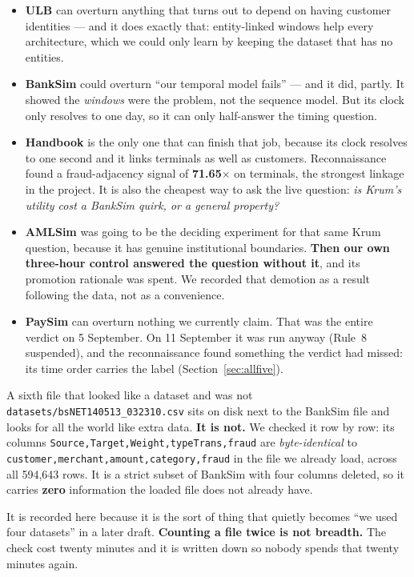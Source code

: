 \documentclass[11pt]{article}
\begin{document}
\begin{itemize}
  \item \textbf{ULB} can overturn anything that turns out to depend on having customer identities ---
  and it does exactly that: entity-linked windows help every architecture, which we could only learn by
  keeping the dataset that has no entities.
  \item \textbf{BankSim} could overturn ``our temporal model fails'' --- and it did, partly. It showed
  the \emph{windows} were the problem, not the sequence model. But its clock only resolves to one day,
  so it can only half-answer the timing question.
  \item \textbf{Handbook} is the only one that can finish that job, because its clock resolves to one
  second and it links terminals as well as customers. Reconnaissance found a fraud-adjacency signal of
  \textbf{71.65$\times$} on terminals, the strongest linkage in the project. It is also the cheapest way
  to ask the live question: \emph{is Krum's utility cost a BankSim quirk, or a general property?}
  \item \textbf{AMLSim} was going to be the deciding experiment for that same Krum question, because it
  has genuine institutional boundaries. \textbf{Then our own three-hour control answered the question
  without it}, and its promotion rationale was spent. We recorded that demotion as a result following
  the data, not as a convenience.
  \item \textbf{PaySim} can overturn nothing we currently claim. That was the entire verdict on
  5 September. On 11 September it was run anyway (Rule~8 suspended), and the reconnaissance found
  something the verdict had missed: its time order carries the label (Section~\ref{sec:allfive}).
\end{itemize}

\begin{warnbox}{A sixth file that looked like a dataset and was not}
\texttt{datasets/bsNET140513\_032310.csv} sits on disk next to the BankSim file and looks for all the
world like extra data. \textbf{It is not.} We checked it row by row: its columns
\texttt{Source,Target,Weight,typeTrans,fraud} are \emph{byte-identical} to
\texttt{customer,merchant,amount,category,fraud} in the file we already load, across all 594{,}643 rows.
It is a strict subset of BankSim with four columns deleted, so it carries \textbf{zero} information the
loaded file does not already have.

It is recorded here because it is the sort of thing that quietly becomes ``we used four datasets'' in a
later draft. \textbf{Counting a file twice is not breadth.} The check cost twenty minutes and it is
written down so nobody spends that twenty minutes again.
\end{warnbox}
\end{document}
